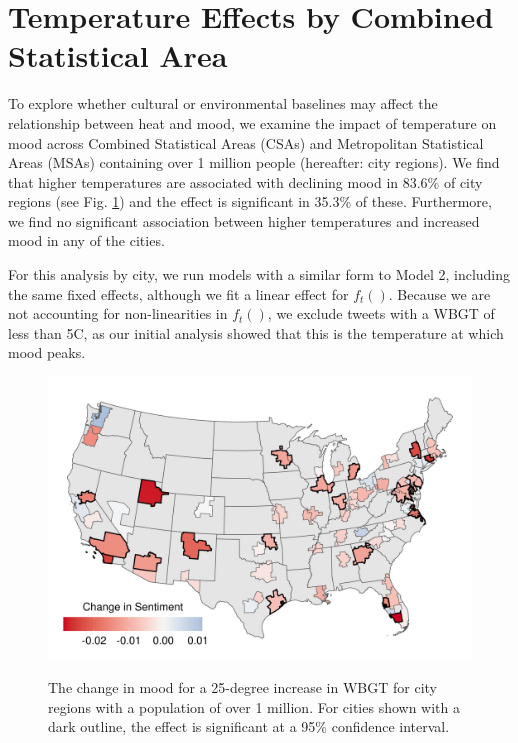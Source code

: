 \documentclass{article}
\begin{document}
\section*{Temperature Effects by Combined Statistical Area}
To explore whether cultural or environmental baselines may affect the relationship between heat and mood, we examine the impact of temperature on mood across Combined Statistical Areas (CSAs) and Metropolitan Statistical Areas (MSAs) containing over 1 million people (hereafter: city regions). We find that higher temperatures are associated with declining mood in 83.6\% of city regions (see Fig. \ref{fig:map}) and the effect is significant in 35.3\% of these. Furthermore, we find no significant association between higher temperatures and increased mood in any of the cities.

For this analysis by city, we run models with a similar form to Model 2, including the same fixed effects, although we fit a linear effect for $f_t()$.  Because we are not accounting for non-linearities in $f_t()$, we exclude tweets with a WBGT of less than 5\textdegree C, as our initial analysis showed that this is the temperature at which mood peaks.

\begin{figure}[H]
\centering
  \includegraphics[width=\linewidth]{../res/map_wbgt.png}
  \label{fig:map}
    \caption{The change in mood for a 25-degree increase in WBGT for city regions with a population of over 1 million.  For cities shown with a dark outline, the effect is significant at a 95\% confidence interval.}
\end{figure}
\end{document}
